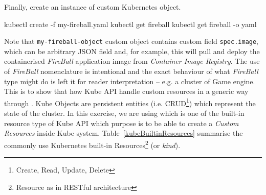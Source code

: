 \noindent Finally, create an instance of  custom Kubernetes object.
\begin{lcverbatim}
kubectl create -f my-fireball.yaml
kubectl get fireball
kubectl get fireball -o yaml
\end{lcverbatim}

\noindent Note that \verb|my-fireball-object| custom object contains custom field \verb|spec.image|, which can be arbitrary JSON field and, for example, this will pull and deploy the containerised \emph{FireBall} application image from \emph{Container Image Registry}. The use of \textit{FireBall} nomenclature is intentional and the exact behaviour of what \emph{FireBall} type might do is left it for reader interpretation -- e.g. a cluster of Game engine. This is to show that how Kube API handle custom resources in a generic way through . Kube Objects are persistent entities (i.e. CRUD\footnote{Create, Read, Update, Delete}) which represent the state of the cluster. In this exercise, we are using  which is one of the built-in resource type of Kube API which purpose is to be able to create a \textit{Custom Resources} inside Kube system. Table~\ref{kubeBuiltinResources} summarise the commonly use Kubernetes built-in Resources\footnote{Resource as in RESTful architecture} (or \emph{kind}).

